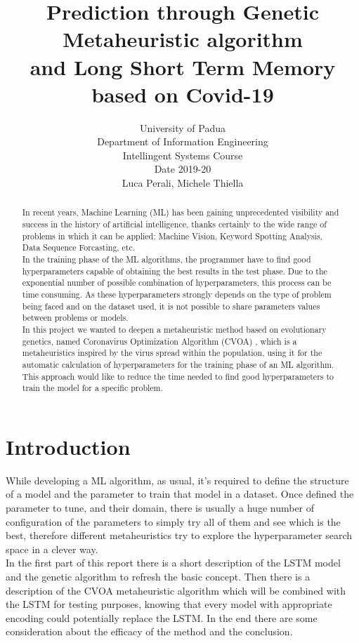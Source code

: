 \documentclass[letterpaper]{article}%
\title{Prediction through Genetic Metaheuristic algorithm \\ and Long Short Term Memory based on Covid-19}
\author{ University of Padua \\ Department of Information Engineering \\ Intellingent Systems Course \\ Date 2019-20 \\ %
Luca Perali, Michele Thiella
}
\begin{document}
\maketitle

\begin{abstract}
	In recent years, Machine Learning (ML) has been gaining unprecedented visibility and success in the history of artificial intelligence, thanks certainly to the wide range of problems in which it can be applied: Machine Vision, Keyword Spotting Analysis, Data Sequence Forcasting, etc. \\
	In the training phase of the ML algorithms, the programmer have to find good hyperparameters capable of obtaining the best results in the test phase. Due to the exponential number of possible combination of hyperparameters, this process can be time consuming. As these hyperparameters strongly depends on the type of problem being faced and on the dataset used, it is not possible to share parameters values between problems or models. \\
	In this project we wanted to deepen a metaheuristic method based on evolutionary genetics, named Coronavirus Optimization Algorithm (CVOA) \cite{martnezlvarez2020coronavirus}, which is a metaheuristics inspired by the virus spread within the population, using it for the automatic calculation of hyperparameters for the training phase of an ML algorithm. This approach would like to reduce the time needed to find good hyperparameters to train the model for a specific problem.
	
\end{abstract}

\section{Introduction}
	While developing a ML algorithm, as usual, it's required to define the structure of a model and the parameter to train that model in a dataset. Once defined the parameter to tune, and their domain, there is usually a huge number of configuration of the parameters to simply try all of them and see which is the best, therefore different metaheuristics try to explore the hyperparameter search space in a clever way. \\
	In the first part of this report there is a short description of the LSTM model and the genetic algorithm to refresh the basic concept. Then there is a description of the CVOA metaheuristic algorithm which will be combined with the LSTM for testing purposes, knowing that every model with appropriate encoding could potentially replace the LSTM. In the end there are some consideration about the efficacy of the method and the conclusion. 
	
\end{document}
